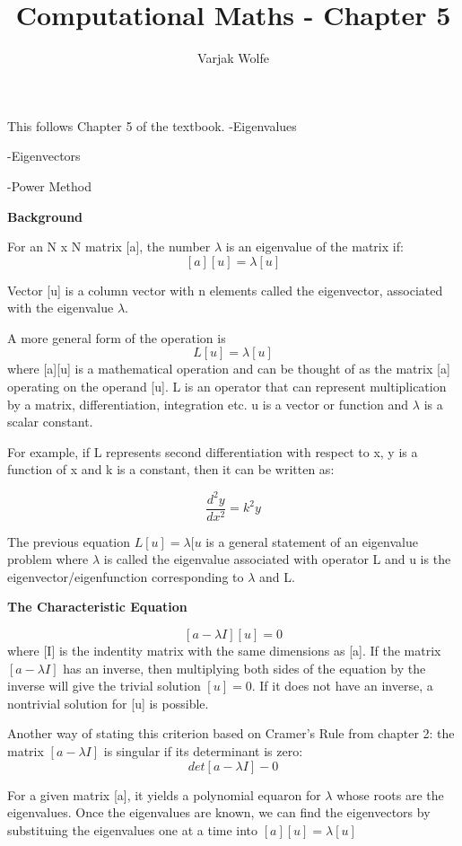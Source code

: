 \documentclass{article}
\title{Computational Maths - Chapter 5}
\author{Varjak Wolfe}
\begin{document}
\maketitle

This follows Chapter 5 of the textbook.
-Eigenvalues

-Eigenvectors

-Power Method



\textbf{Background}

For an N x N matrix [a], the number $\lambda$ is an eigenvalue of the matrix if:
\[[a][u] =  \lambda[u] \]

Vector [u] is a column vector with n elements called the eigenvector, associated with the eigenvalue  $\lambda$.

A more general form of the operation is
\[L[u] =  \lambda[u] \]
where [a][u] is a mathematical operation and can be thought of as the matrix [a] operating on the operand [u]. L is an operator that can represent multiplication by a matrix, differentiation, integration etc. u is a vector or function and $\lambda$ is a scalar constant. 

For example, if L represents second differentiation with respect to x, y is a function of x and k is a constant, then it can be written as:

\[ \frac{d^2y}{dx^2} = k^2y\]

The previous equation \textbf{\(L[u] =  \lambda[u\)} is a general statement of an eigenvalue problem where $\lambda$ is called the eigenvalue associated with operator L and u is the eigenvector/eigenfunction corresponding to $\lambda$ and L.

\textbf{The Characteristic Equation}

\[[a-\lambda I][u] = 0\] where [I] is the indentity matrix with the same dimensions as [a]. If the matrix \([a-\lambda I]\) has an inverse, then multiplying both sides of the equation by the inverse will give the trivial solution $[u] = 0$. If it does not have an inverse, a nontrivial solution for [u] is possible.

Another way of stating this criterion based on Cramer's Rule from chapter 2: the matrix $[a-\lambda I]$ is singular if its determinant is zero:
\[ det[a-\lambda I] - 0\]

For a given matrix [a], it yields a polynomial equaron for $\lambda$ whose roots are the eigenvalues. Once the eigenvalues are known, we can find the eigenvectors by substituing the eigenvalues one at a time into \([a][u] =  \lambda[u] \)
\end{document}
